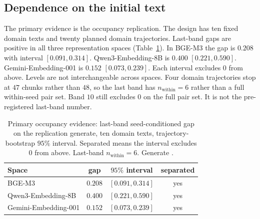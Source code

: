 \documentclass[10pt]{article}
\begin{document}
\subsection{Dependence on the initial text}
\label{sec:dependence}

The primary evidence is the occupancy replication.
The design has ten fixed domain texts and twenty planned domain
trajectories. %
Last-band gaps are positive in all three representation spaces
(Table~\ref{tab:repl}).
In BGE-M3 the gap is $0.208$ with interval $[0.091, 0.314]$. %
Qwen3-Embedding-8B is $0.400$ $[0.221, 0.590]$. %
Gemini-Embedding-001 is $0.152$ $[0.073, 0.239]$. %
Each interval excludes $0$ from above.
Levels are not interchangeable across spaces.
Four domain trajectories stop at $47$ chunks rather than $48$, so the
last band has $n_{\mathrm{within}}{=}6$ rather than a full within-seed
pair set. %
Band $10$ still excludes $0$ on the full pair set.
It is not the pre-registered last-band number. %

\begin{table}[t]
  \centering
  \caption{Primary occupancy evidence: last-band seed-conditioned gap on
    the replication generate, ten domain texts, trajectory-bootstrap
    $95\%$ interval. %
    Separated means the interval excludes $0$ from above.
    Last-band $n_{\mathrm{within}}{=}6$. %
    Generate \protect{}.}
  \label{tab:repl}
  \begin{tabular}{@{}lccc@{}}
    \toprule
    Space & gap & $95\%$ interval & separated \\
    \midrule
    BGE-M3 & $0.208$ & $[0.091, 0.314]$ & yes \\ %
    Qwen3-Embedding-8B & $0.400$ & $[0.221, 0.590]$ & yes \\ %
    Gemini-Embedding-001 & $0.152$ & $[0.073, 0.239]$ & yes \\ %
    \bottomrule
  \end{tabular}
\end{table}
\end{document}
